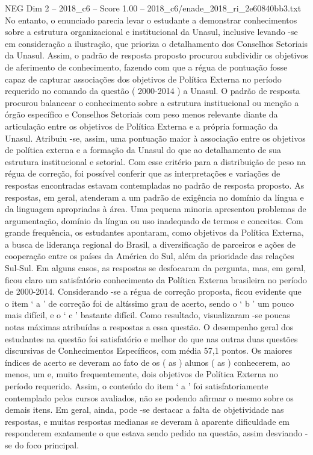 \begin{textsample}{NEG Dim 2 – 2018\_c6 – Score 1.00 – 2018\_c6/enade\_2018\_ri\_2e60840bb3.txt}
No entanto, o enunciado parecia levar o estudante a demonstrar conhecimentos sobre a estrutura organizacional e institucional da Unasul, inclusive levando -se em consideração a ilustração, que prioriza o detalhamento dos Conselhos Setoriais da Unasul.
Assim, o padrão de resposta proposto procurou subdividir os objetivos de aferimento de conhecimento, fazendo com que a régua de pontuação fosse capaz de capturar associações dos objetivos de Política Externa no período requerido no comando da questão ( 2000-2014 ) a Unasul.
O padrão de resposta procurou balancear o conhecimento sobre a estrutura institucional ou menção a órgão específico e Conselhos Setoriais com peso menos relevante diante da articulação entre os objetivos de Política Externa e a própria formação da Unasul.
Atribuiu -se, assim, uma pontuação maior à associação entre os objetivos de política externa e a formação da Unasul do que ao detalhamento de sua estrutura institucional e setorial.
Com esse critério para a distribuição de peso na régua de correção, foi possível conferir que as interpretações e variações de respostas encontradas estavam contempladas no padrão de resposta proposto.
As respostas, em geral, atenderam a um padrão de exigência no domínio da língua e da linguagem apropriadas à área.
Uma pequena minoria apresentou problemas de argumentação, domínio da língua ou uso inadequado de termos e conceitos.
Com grande frequência, os estudantes apontaram, como objetivos da Política Externa, a busca de liderança regional do Brasil, a diversificação de parceiros e ações de cooperação entre os países da América do Sul, além da prioridade das relações Sul-Sul.
Em alguns casos, as respostas se desfocaram da pergunta, mas, em geral, ficou claro um satisfatório conhecimento da Política Externa brasileira no período de 2000-2014.
Considerando -se a régua de correção proposta, ficou evidente que o item ‘ a ’ de correção foi de altíssimo grau de acerto, sendo o ‘ b ’ um pouco mais difícil, e o ‘ c ’ bastante difícil.
Como resultado, visualizaram -se poucas notas máximas atribuídas a respostas a essa questão.
O desempenho geral dos estudantes na questão foi satisfatório e melhor do que nas outras duas questões discursivas de Conhecimentos Específicos, com média 57,1 pontos.
Os maiores índices de acerto se deveram ao fato de os ( as ) alunos ( as ) conhecerem, ao menos, um e, muito frequentemente, dois objetivos de Política Externa no período requerido.
Assim, o conteúdo do item ‘ a ’ foi satisfatoriamente contemplado pelos cursos avaliados, não se podendo afirmar o mesmo sobre os demais itens.
Em geral, ainda, pode -se destacar a falta de objetividade nas respostas, e muitas respostas medianas se deveram à aparente dificuldade em responderem exatamente o que estava sendo pedido na questão, assim desviando -se do foco principal.

\end{textsample}

